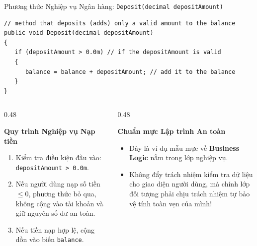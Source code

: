 \documentclass[aspectratio=169, 10pt]{beamer}
\begin{document}
\begin{frame}[fragile]{Phương thức Nghiệp vụ Ngân hàng: \texttt{Deposit(decimal depositAmount)}}
  \begin{tcolorbox}[colback=CodeBg,colframe=UniNavy,title=\textbf{Phương thức Nạp tiền Deposit (Fig. 4.11)},fonttitle=\small\bfseries]
\begin{lstlisting}
// method that deposits (adds) only a valid amount to the balance
public void Deposit(decimal depositAmount)
{
   if (depositAmount > 0.0m) // if the depositAmount is valid
   {
      balance = balance + depositAmount; // add it to the balance
   }
}
\end{lstlisting}
  \end{tcolorbox}
  \begin{columns}[T]
    \begin{column}{0.48\textwidth}
      \begin{block}{\textbf{Quy trình Nghiệp vụ Nạp tiền}}
        \begin{enumerate}\small
          \item Kiểm tra điều kiện đầu vào: \texttt{depositAmount > 0.0m}.
          \item Nếu người dùng nạp số tiền $\le 0$, phương thức bỏ qua, không cộng vào tài khoản và giữ nguyên số dư an toàn.
          \item Nếu tiền nạp hợp lệ, cộng dồn vào biến \texttt{balance}.
        \end{enumerate}
      \end{block}
    \end{column}

    \begin{column}{0.48\textwidth}
      \begin{exampleblock}{\textbf{Chuẩn mực Lập trình An toàn}}
        \begin{itemize}\small
          \item Đây là ví dụ mẫu mực về \textbf{Business Logic} nằm trong lớp nghiệp vụ.
          \item Không đẩy trách nhiệm kiểm tra dữ liệu cho giao diện người dùng, mà chính lớp đối tượng phải chịu trách nhiệm tự bảo vệ tính toàn vẹn của mình!
        \end{itemize}
      \end{exampleblock}
    \end{column}
  \end{columns}
\end{frame}
\end{document}
